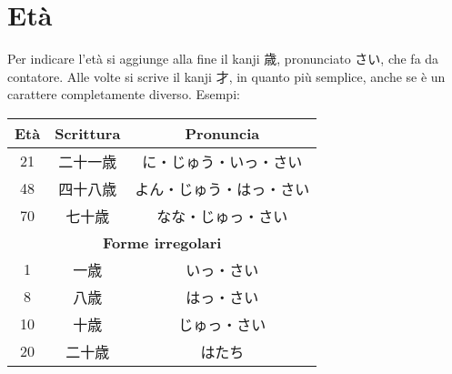 \documentclass{article}
\let\ita\textitalian
\newcommand{\itabf}[1]{\ita{\textbf{#1}}}
\newenvironment{tabJap}{\begin{center}\begin{japanese}\begin{longtable}{|c|c|c|}}{\end{longtable}\end{japanese}\end{center}}
\begin{document}
    \section{Età}

        Per indicare l'età si aggiunge alla fine il kanji \textjapanese{歳}, pronunciato \textjapanese{さい}, che fa
        da contatore. Alle volte si scrive il kanji \textjapanese{才}, in quanto più semplice, anche se è un carattere
        completamente diverso. Esempi:

        \begin{tabJap}
            \hline
            \itabf{Età} & \itabf{Scrittura} & \itabf{Pronuncia}\\
            \hline\hline
            21 & 二十一歳 & に・じゅう・いっ・さい\\
            \hline
            48 & 四十八歳 & よん・じゅう・はっ・さい\\
            \hline
            70 & 七十歳 & なな・じゅっ・さい\\
            \hline\hline
            \multicolumn{3}{|c|}{\itabf{Forme irregolari}}\\
            \hline\hline
            1 & 一歳 & いっ・さい\\
            \hline
            8 & 八歳 & はっ・さい\\
            \hline
            10 & 十歳 & じゅっ・さい\\
            \hline
            20 & 二十歳 & はたち\\
            \hline
        \end{tabJap}
\end{document}
